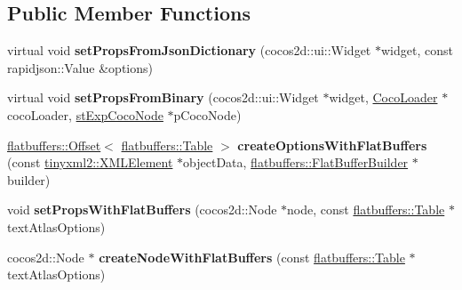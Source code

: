 \subsection*{Public Member Functions}
\begin{DoxyCompactItemize}
\item 
\mbox{\label{classcocostudio_1_1TextAtlasReader_a70c253c7fbfe6185b6fdcc80d37d1ca3}} 
virtual void {\bfseries set\+Props\+From\+Json\+Dictionary} (cocos2d\+::ui\+::\+Widget $\ast$widget, const rapidjson\+::\+Value \&options)
\item 
\mbox{\label{classcocostudio_1_1TextAtlasReader_a0ee4a63824df66c990319414fca71e95}} 
virtual void {\bfseries set\+Props\+From\+Binary} (cocos2d\+::ui\+::\+Widget $\ast$widget, \hyperlink{classcocostudio_1_1CocoLoader}{Coco\+Loader} $\ast$coco\+Loader, \hyperlink{structcocostudio_1_1stExpCocoNode}{st\+Exp\+Coco\+Node} $\ast$p\+Coco\+Node)
\item 
\mbox{\label{classcocostudio_1_1TextAtlasReader_a27001d798ab817a69d1eebff2b62f359}} 
\hyperlink{structflatbuffers_1_1Offset}{flatbuffers\+::\+Offset}$<$ \hyperlink{classflatbuffers_1_1Table}{flatbuffers\+::\+Table} $>$ {\bfseries create\+Options\+With\+Flat\+Buffers} (const \hyperlink{classtinyxml2_1_1XMLElement}{tinyxml2\+::\+X\+M\+L\+Element} $\ast$object\+Data, \hyperlink{classflatbuffers_1_1FlatBufferBuilder}{flatbuffers\+::\+Flat\+Buffer\+Builder} $\ast$builder)
\item 
\mbox{\label{classcocostudio_1_1TextAtlasReader_afb6e75370da30463b946d316755085ab}} 
void {\bfseries set\+Props\+With\+Flat\+Buffers} (cocos2d\+::\+Node $\ast$node, const \hyperlink{classflatbuffers_1_1Table}{flatbuffers\+::\+Table} $\ast$text\+Atlas\+Options)
\item 
\mbox{\label{classcocostudio_1_1TextAtlasReader_a5f77318f431f10c6afd83bc91296d3b2}} 
cocos2d\+::\+Node $\ast$ {\bfseries create\+Node\+With\+Flat\+Buffers} (const \hyperlink{classflatbuffers_1_1Table}{flatbuffers\+::\+Table} $\ast$text\+Atlas\+Options)
\item 
\mbox{\label{classcocostudio_1_1TextAtlasReader_a70c253c7fbfe6185b6fdcc80d37d1ca3}} 

\end{DoxyCompactItemize}
